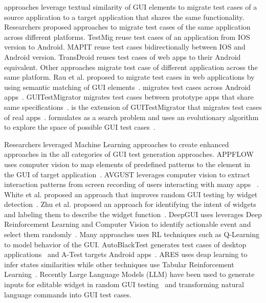 \bigskip
\testreuse approaches leverage textual similarity of GUI elements to migrate test cases of a source application to a target application that shares the same functionality. 
Researchers proposed approaches to migrate test cases of the same  application across different platforms. 
TestMig reuse test cases of an application from IOS version to Android\cite{Qin:testmig:ISSTA:2019}.
MAPIT reuse test cases bidirectionally between IOS and Android version\cite{talebipour:MAPIT:ASE:2021}.
TransDroid reuses test cases of web apps to their Android equivalent\cite{lin:TransDroid:ICST:2022}.
Other approaches migrate test case of different application across the same platform. 
 Rau et al. proposed to migrate test cases in web applications by using semantic matching of GUI elements~\cite{rau:efficent:icse:2018}.
 \craftdroid migrates test cases across Android apps~\cite{lin:craftdroid:ASE:2019}.
 GUITestMigrator migrates test cases between prototype apps that share same specifications~\cite{Behrang:migra:ISSTA:2018}.
 \atm is the extension of GUITestMigrator that migrates test cases of real apps~\cite{Behrang:migration:ICSE:2018}.
 \adaptdroid formulates \testreuse as a search problem and uses an evolutionary algorithm to explore the space of possible GUI test cases~\cite{Mariani:Adaptdroid:AST:2021}.
 
 
\bigskip
Researchers leveraged Machine Learning approaches to create enhanced approaches in the all categories of GUI test generation approaches. 
APPFLOW uses computer vision to map elements of predefined patterns to the element in the GUI of target application~\cite{Hu:appflow:FSE:2018}.
AVGUST leverages computer vision to extract interaction patterns from screen recording of users interacting with many apps~\cite{zhao:Avgust:FSE:2022} .
White et al. proposed an approach that improves random GUI testing by widget detection~\cite{white:WidgetDetection:ISSTA:2019}. 
Zhu et al. proposed an approach for identifying the intent of widgets and labeling them to describe the widget function~\cite{zhu2021widgetrecog}. 
DeepGUI uses leverages Deep Reinforcement Learning  and Computer Vision to identify actionable event and select them randomly~\cite{YazdaniBanafsheDaragh:DEEPGUI:ASE:2021}.
Many approaches uses RL techniques such as Q-Learning to model behavior of the GUI.
AutoBlackTest generates test cases of desktop applications~\cite{Mariani:ABT:STVR:2014} and A-Test  targets Android apps~\cite{Vuong:RLTest:A-Test:2018}.
ARES uses deap learning to infer states similarities while other techniques use Tabular Reinforcement Learning~\cite{Romdhana:ARES:TOSEM:2022}.
Recently Large Language Models (LLM) have been used to generate inputs for editable widget in random GUI testing~\cite{liu:GUIInputLLM:ICSE:2023} and transforming natural language commands into GUI test cases\cite{Zimmermann:GPT3GUITest:2023:ICSTW}. 
 


